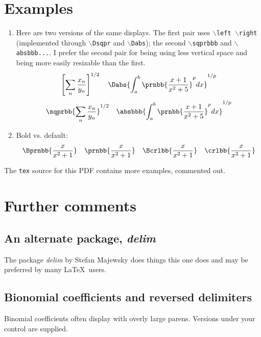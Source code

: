 \documentclass{amsart}
\begin{document}
\section{Examples}
\begin{enumerate}


\item Here are two versions of the same displays. 
The first pair uses $\backslash$\texttt{left $\backslash$right} (implemented through $\backslash$\texttt{Dsqpr}
and $\backslash$\texttt{Dabs}); the
second $\backslash$\texttt{sqprbbb} and $\backslash$\texttt{absbbb...}.
I prefer the second pair for being using less vertical space and being more easily  resizable than the first.
 \[
 \left[ \sum_n\frac{x_n}{y_n}\right]^{1/2}
 \quad  \Dabs{\int_a^b\prnbb{\frac{x+1}{x^2+5}}^p  dx}^{1/p}
 \]
 \[
 \sqprbb{\sum_n\frac{x_n}{y_n}}^{1/2}\quad
\absbbb{\int_a^b\prnbb{\frac{x+1}{x^2+5}}^p  dx}^{1/p}
 \]
 \item Bold vs. default:
 \[
  \Bprnbb{\frac x{x^2+1}} \quad  \prnbb{\frac x{x^2+1}} \quad
  \Bcrlbb{\frac x{x^2+1}} \quad  \crlbb{\frac x{x^2+1}} 
 \] 
 \end{enumerate}
 

 The \texttt{tex} source for this PDF contains more examples, commented out.
 
 \section{Further comments}
 \subsection{An alternate package, \textit{delim}}
 The package \textit{delim} by Stefan Majewsky 
 does things this one does
 and may be preferred by many \LaTeX\ users.
 
 \subsection{Bionomial coefficients  and reversed delimiters}
  
 Binomial coefficients often display with overly large parens. Versions under your control
 are supplied.
 
\end{document}
